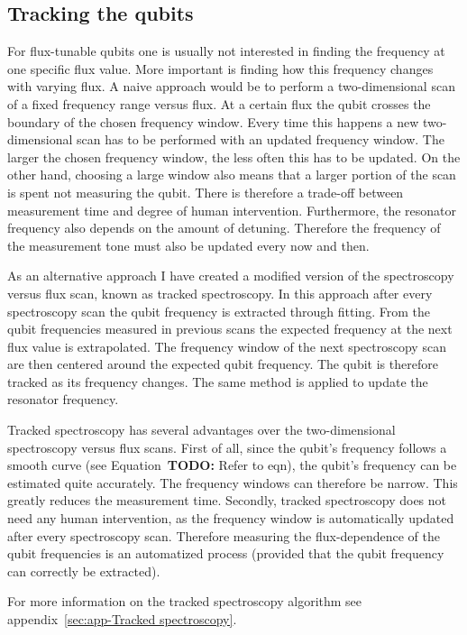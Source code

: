 \documentclass[12pt]{report}
\begin{document}
      \subsection{Tracking the qubits}
        For flux-tunable qubits one is usually not interested in finding the frequency at one specific flux value. More important is finding how this frequency changes with varying flux. A naive approach would be to perform a two-dimensional scan of a fixed frequency range versus flux. At a certain flux the qubit crosses the boundary of the chosen frequency window. Every time this happens a new two-dimensional scan has to be performed with an updated frequency window. The larger the chosen frequency window, the less often this has to be updated. On the other hand, choosing a large window also means that a larger portion of the scan is spent not measuring the qubit. There is therefore a trade-off between measurement time and degree of human intervention. Furthermore, the resonator frequency also depends on the amount of detuning. Therefore the frequency of the measurement tone must also be updated every now and then.

        As an alternative approach I have created a modified version of the spectroscopy versus flux scan, known as tracked spectroscopy. In this approach after every spectroscopy scan the qubit frequency is extracted through fitting. From the qubit frequencies measured in previous scans the expected frequency at the next flux value is extrapolated. The frequency window of the next spectroscopy scan are then centered around the expected qubit frequency. The qubit is therefore tracked as its frequency changes. The same method is applied to update the resonator frequency.

        Tracked spectroscopy has several advantages over the two-dimensional spectroscopy versus flux scans. First of all, since the qubit's frequency follows a smooth curve (see Equation~\textbf{TODO:} Refer to eqn), the qubit's frequency can be estimated quite accurately. The frequency windows can therefore be narrow. This greatly reduces the measurement time. Secondly, tracked spectroscopy does not need any human intervention, as the frequency window is automatically updated after every spectroscopy scan. Therefore measuring the flux-dependence of the qubit frequencies is an automatized process (provided that the qubit frequency can correctly be extracted).

        For more information on the tracked spectroscopy algorithm see appendix~\ref{sec:app-Tracked spectroscopy}.
\end{document}
